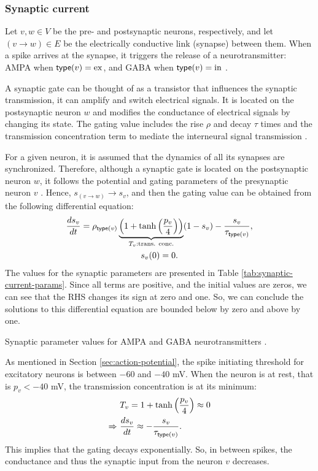\subsubsection{Synaptic current}

Let $v, w \in V$ be the pre- and postsynaptic neurons, respectively, and let $(v \to w) \in E$ be the electrically conductive link (synapse) between them. When a spike arrives at the synapse, it triggers the release of a neurotransmitter: AMPA when $\mathsf{type}(v) = \mathrm{ex}$, and GABA when $\mathsf{type}(v) = \mathrm{in}$ \cite{Lowet2015}.

A synaptic gate can be thought of as a transistor that influences the synaptic transmission, it can amplify and switch electrical signals. It is located on the postsynaptic neuron $w$ and modifies the conductance of electrical signals by changing its state. The gating value includes the rise $\rho$ and decay $\tau$ times and the transmission concentration term to mediate the interneural signal transmission \cite{Destexhe1994}.

For a given neuron, it is assumed that the dynamics of all its synapses are synchronized. Therefore, although a synaptic gate is located on the postsynaptic neuron $w$, it follows the potential and gating parameters of the presynaptic neuron $v$ \cite{Lowet2015}. Hence, $s_{(v \to w)} \to s_v$, and then the gating value can be obtained from the following differential equation:
\begin{gather}
    \frac{ds_v}{dt} = \rho_{\mathsf{type}(v)} \underbrace{\left( 1 + \tanh \left( \frac{p_{v}}{4} \right) \right)}_{T_v: \text{trans. conc.}} (1 - s_v) - \frac{s_v}{\tau_{\mathsf{type}(v)}}, \\
    \label{eq:synaptic-gates}
    s_v(0) = 0.
\end{gather}
The values for the synaptic parameters are presented in Table \ref{tab:synaptic-current-params}.
Since all terms are positive, and the initial values are zeros, we can see that the RHS changes its sign at zero and one. So, we can conclude the solutions to this differential equation are bounded below by zero and above by one.

\begin{table}[!htp] 
    \centering
    
    \caption[Synaptic parameter values]{Synaptic parameter values for AMPA and GABA neurotransmitters \cite{Lowet2015}.}
    \label{tab:synaptic-current-params}
\end{table}


As mentioned in Section \ref{sec:action-potential}, the spike initiating threshold for excitatory neurons is between $-60$ and $-40$ mV. When the neuron is at rest, that is $p_v < -40$ mV, the transmission concentration is at its minimum:
\begin{gather}
\begin{split}
    & T_v = 1 + \tanh \left( \frac{p_{v}}{4} \right) \approx 0 \\
    \Rightarrow \ & \frac{ds_v}{dt} \approx - \frac{s_v}{\tau_{\mathsf{type}(v)}}.
\end{split}
\end{gather}
This implies that the gating decays exponentially.
So, in between spikes, the conductance and thus the synaptic input from the neuron $v$ decreases. 

